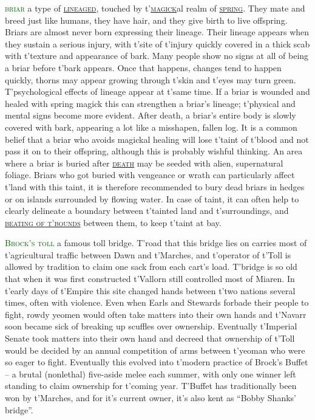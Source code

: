 \documentclass[twoside,11pt,b5paper,twocolumn]{scrbook}
\newcommand{\estcab}[1]{\textsc{\textcolor{marron}{#1}}}
\newcommand{\keyword}[1]{\textcolor{darkgreen}{#1}}
\renewcommand{\paragraph}[1]{\par\noindent\markboth{#1}{#1}\estcab{\keyword{#1}}\label{#1} }
\newcommand{\see}[1]{{\estcab{\hyperref[#1]{#1}}}}
\begin{document}
\paragraph{briar} a type of \see{lineaged}, touched by t'\see{magick}al realm of \see{spring}. They mate and breed just like humans, they have hair, and they give birth to live offspring. Briars are almost never born expressing their lineage. Their lineage appears when they sustain a serious injury, with t'site of t'injury quickly covered in a thick scab with t'texture and appearance of bark. Many people show no signs at all of being a briar before t'bark appears. Once that happens, changes tend to happen quickly, thorns may appear growing through t'skin and t'eyes may turn green. T'psychological effects of lineage appear at t'same time. If a briar is wounded and healed with spring magick this can strengthen a briar's lineage; t'physical and mental signs become more evident. After death, a briar’s entire body is slowly covered with bark, appearing a lot like a misshapen, fallen log. It is a common belief that a briar who avoids magickal healing will lose t'taint of t'blood and not pass it on to their offspring, although this is probably wishful thinking. An area where a briar is buried after \see{death} may be seeded with alien, supernatural foliage. Briars who got buried with vengeance or wrath can particularly affect t'land with this taint, it is therefore recommended to bury dead briars in hedges or on islands surrounded by flowing water. In case of taint, it can often help to clearly delineate a boundary between t'tainted land and t'surroundings, and \see{beating of t'bounds} between them, to keep t'taint at bay.
\paragraph{Brock's toll} a famous toll bridge. T'road that this bridge lies on carries most of t'agricultural traffic between Dawn and t'Marches, and t'operator of t'Toll is allowed by tradition to claim one sack from each cart's load. T'bridge is so old that when it was first constructed t'Vallorn still controlled most of Miaren. In t'early days of t'Empire this site changed hands between t'two nations several times, often with violence. Even when Earls and Stewards forbade their people to fight, rowdy yeomen would often take matters into their own hands and t'Navarr soon became sick of breaking up scuffles over ownership. Eventually t'Imperial Senate took matters into their own hand and decreed that ownership of t'Toll would be decided by an annual competition of arms between t'yeoman who were so eager to fight. Eventually this evolved into t'modern practice of Brock's Buffet – a brutal (nonlethal) five-aside melee each summer, with only one winner left standing to claim ownership for t'coming year. T'Buffet has traditionally been won by t'Marches, and for it's current owner, it's also kent as “Bobby Shanks' bridge”.
\end{document}
